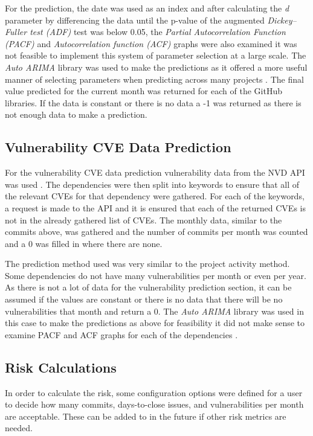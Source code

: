 \documentclass[conference]{IEEEtran}
\begin{document}
{For the prediction, the date was used as an index and after calculating the \textit{d} parameter by differencing the data until the p-value of the augmented \textit{Dickey–Fuller test (ADF)} test was below 0.05, the \textit{Partial Autocorrelation Function (PACF)} and \textit{Autocorrelation function (ACF)} graphs were also examined it was not feasible to implement this system of parameter selection at a large scale. The \textit{Auto ARIMA} library was used to make the predictions as it offered a more useful manner of selecting parameters when predicting across many projects \cite{noauthor_pmdarima_nodate}. The final value predicted for the current month was returned for each of the GitHub libraries. If the data is constant or there is no data a -1 was returned as there is not enough data to make a prediction. 

\subsection{Vulnerability CVE Data Prediction}
For the vulnerability CVE data prediction vulnerability data from the NVD API was used \cite{noauthor_vulnerability_nodate}. The dependencies were then split into keywords to ensure that all of the relevant CVEs for that dependency were gathered. For each of the keywords, a request is made to the API and it is ensured that each of the returned CVEs is not in the already gathered list of CVEs. The monthly data, similar to the commits above, was gathered and the number of commits per month was counted and a 0 was filled in where there are none. 

The prediction method used was very similar to the project activity method. Some dependencies do not have many vulnerabilities per month or even per year. As there is not a lot of data for the vulnerability prediction section, it can be assumed if the values are constant or there is no data that there will be no vulnerabilities that month and return a 0. The \textit{Auto ARIMA} library was used in this case to make the predictions as above for feasibility it did not make sense to examine PACF and ACF graphs for each of the dependencies \cite{noauthor_pmdarima_nodate}. 


\subsection{Risk Calculations}
In order to calculate the risk, some configuration options were defined for a user to decide how many commits, days-to-close issues, and vulnerabilities per month are acceptable. These can be added to in the future if other risk metrics are needed. 

}
\end{document}
